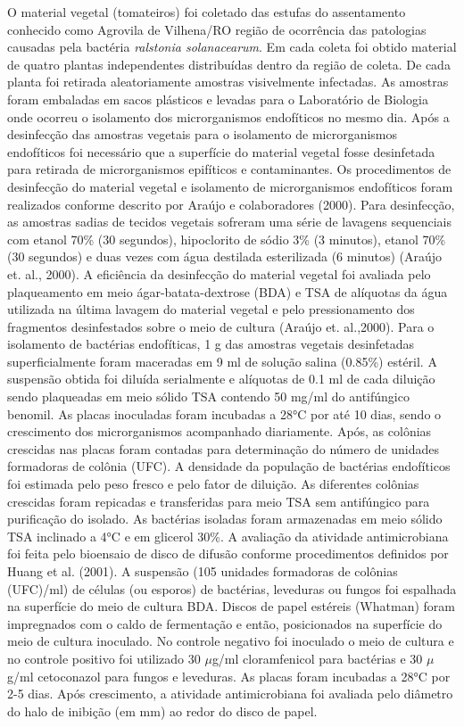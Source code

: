 \documentclass[article,12pt,onesidea,4paper,english,brazil]{abntex2}
\begin{document}
O material vegetal (tomateiros) foi coletado das estufas do assentamento conhecido como Agrovila de Vilhena/RO região de ocorrência das patologias causadas pela bactéria \textit{ralstonia solanacearum}.  Em cada coleta foi obtido material de quatro plantas independentes distribuídas dentro da região de coleta. De cada planta foi retirada aleatoriamente amostras visivelmente infectadas. As amostras foram embaladas em sacos plásticos e levadas para o Laboratório de Biologia onde ocorreu o isolamento dos microrganismos endofíticos no mesmo dia. Após a desinfecção das amostras vegetais para o isolamento de microrganismos endofíticos foi necessário que a superfície do material vegetal fosse desinfetada para retirada de microrganismos epifíticos e contaminantes. Os procedimentos de desinfecção do material vegetal e isolamento de microrganismos endofíticos foram realizados conforme descrito por Araújo e colaboradores (2000). Para desinfecção, as amostras sadias de tecidos vegetais sofreram uma série de lavagens sequenciais com etanol 70\% (30 segundos), hipoclorito de sódio 3\% (3 minutos), etanol 70\% (30 segundos) e duas vezes com água destilada esterilizada (6 minutos) (Araújo et. al., 2000). A eficiência da desinfecção do material vegetal foi avaliada pelo plaqueamento em meio ágar-batata-dextrose (BDA) e TSA de alíquotas da água utilizada na última lavagem do material vegetal e pelo pressionamento dos fragmentos desinfestados sobre o meio de cultura (Araújo et. al.,2000).
Para o isolamento de bactérias endofíticas, 1 g das amostras vegetais desinfetadas superficialmente foram maceradas em 9 ml de solução salina (0.85\%) estéril. A suspensão obtida foi diluída serialmente e alíquotas de 0.1 ml de cada diluição sendo plaqueadas em meio sólido TSA contendo 50 mg/ml do antifúngico benomil. As placas inoculadas foram incubadas a 28°C por até 10 dias, sendo o crescimento dos microrganismos acompanhado diariamente. Após, as colônias crescidas nas placas foram contadas para determinação do número de unidades formadoras de colônia (UFC). A densidade da população de bactérias endofíticos foi estimada pelo peso fresco e pelo fator de diluição. As diferentes colônias crescidas foram repicadas e transferidas para meio TSA sem antifúngico para purificação do isolado. As bactérias isoladas foram armazenadas em meio sólido TSA inclinado a 4°C e em glicerol 30\%.
A avaliação da atividade antimicrobiana foi feita pelo bioensaio de disco de difusão conforme procedimentos definidos por Huang et al. (2001). A suspensão (105 unidades formadoras de colônias (UFC)/ml) de células (ou esporos) de bactérias, leveduras ou fungos foi espalhada na superfície do meio de cultura BDA. Discos de papel estéreis (Whatman) foram impregnados com o caldo de fermentação e então, posicionados na superfície do meio de cultura inoculado. No controle negativo foi inoculado o meio de cultura e no controle positivo foi utilizado
30 $\mu$g/ml cloramfenicol para bactérias e 30 $\mu$g/ml cetoconazol para fungos e leveduras. As placas foram incubadas a 28°C por 2-5 dias. Após crescimento, a atividade antimicrobiana foi avaliada pelo diâmetro do halo de inibição (em mm) ao redor do disco de papel.
	
\end{document}
